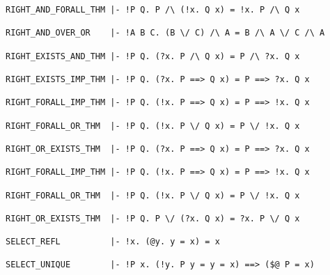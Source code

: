 \begin{boxed}\begin{verbatim}
RIGHT_AND_FORALL_THM |- !P Q. P /\ (!x. Q x) = !x. P /\ Q x

RIGHT_AND_OVER_OR    |- !A B C. (B \/ C) /\ A = B /\ A \/ C /\ A

RIGHT_EXISTS_AND_THM |- !P Q. (?x. P /\ Q x) = P /\ ?x. Q x

RIGHT_EXISTS_IMP_THM |- !P Q. (?x. P ==> Q x) = P ==> ?x. Q x

RIGHT_FORALL_IMP_THM |- !P Q. (!x. P ==> Q x) = P ==> !x. Q x

RIGHT_FORALL_OR_THM  |- !P Q. (!x. P \/ Q x) = P \/ !x. Q x

RIGHT_OR_EXISTS_THM  |- !P Q. (?x. P ==> Q x) = P ==> ?x. Q x

RIGHT_FORALL_IMP_THM |- !P Q. (!x. P ==> Q x) = P ==> !x. Q x

RIGHT_FORALL_OR_THM  |- !P Q. (!x. P \/ Q x) = P \/ !x. Q x

RIGHT_OR_EXISTS_THM  |- !P Q. P \/ (?x. Q x) = ?x. P \/ Q x

SELECT_REFL          |- !x. (@y. y = x) = x

SELECT_UNIQUE        |- !P x. (!y. P y = y = x) ==> ($@ P = x)
\end{verbatim}\end{boxed}

